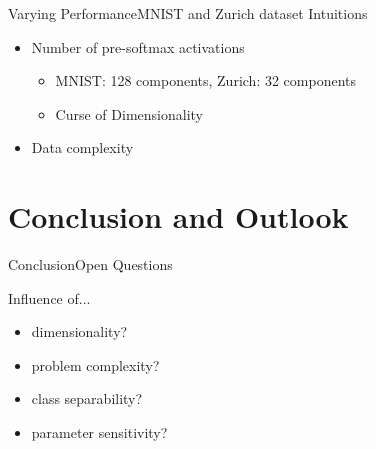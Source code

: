 \documentclass{beamer}
\begin{document}
\begin{frame}{Varying Performance}{MNIST and Zurich dataset}
Intuitions
	\begin{itemize}
		\item Number of pre-softmax activations
		\begin{itemize}
			\item \gls{MNIST}: 128 components, Zurich: 32 components
			\item Curse of Dimensionality
		\end{itemize}
		\item Data complexity
\end{itemize}
\end{frame}





\section{Conclusion and Outlook}

\begin{frame}{Conclusion}{Open Questions}

Influence of...
\begin{itemize}
	\item dimensionality?
	\item problem complexity?
	\item class separability?
	\item parameter sensitivity?
\end{itemize}
\end{frame}
\end{document}
